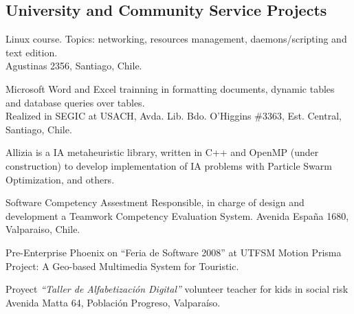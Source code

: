 \documentclass[11pt,letterpaper,roman]{moderncv}
\begin{document}
\subsection{University and Community Service Projects}

	 {\tchr} {\ipgamma} {\stgo} {}
	{\sence Linux course. Topics: networking, resources management,
daemons/scripting and text edition.\\ Agustinas 2356, Santiago, Chile.}

	 {\tchr} {\otecnewline} {\stgo} {}
	{\sence Microsoft Word and Excel trainning in formatting documents,
dynamic tables and database queries over tables. \\
	Realized in SEGIC at USACH, Avda. Lib. Bdo. O'Higgins \#3363, Est.
    	Central, Santiago, Chile.}

	
	{Allizia is a IA metaheuristic library, written in C++ and OpenMP (under
	construction) to develop implementation of IA problems with Particle Swarm Optimization, and others.}

	 { } {} {}
	{Software Competency Assestment Responsible, in charge of design
	and development a Teamwork Competency Evaluation System. Avenida Espa\~na 1680,
	Valparaiso, Chile.}

	 {\sd} { } {} {}
	{Pre-Enterprise Phoenix on ``Feria de Software 2008'' at \textsc{UTFSM}
	Motion Prisma Project: A Geo-based Multimedia System for Touristic.}

	 {\tchr} {\ernestoquiroz } {\valpo} {}
	{Proyect \textit{``Taller de Alfabetizaci\'on Digital''} volunteer
	teacher for kids in social risk Avenida Matta 64, Poblaci\'on Progreso,
	Valpara\'iso.}
	
%

 

\end{document}
